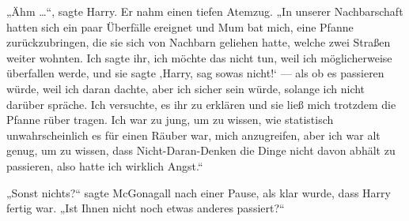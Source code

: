 „Ähm …“, sagte Harry. Er nahm einen tiefen Atemzug.
„In unserer Nachbarschaft hatten sich ein paar Überfälle ereignet und Mum bat mich, eine Pfanne zurückzubringen, die sie sich von Nachbarn geliehen hatte, welche zwei Straßen weiter wohnten. Ich sagte ihr, ich möchte das nicht tun, weil ich möglicherweise überfallen werde, und sie sagte ‚Harry, sag sowas nicht!‘ — als ob es passieren würde, weil ich daran dachte, aber ich sicher sein würde, solange ich nicht darüber spräche. Ich versuchte, es ihr zu erklären und sie ließ mich trotzdem die Pfanne rüber tragen. Ich war zu jung, um zu wissen, wie statistisch unwahrscheinlich es für einen Räuber war, mich anzugreifen, aber ich war alt genug, um zu wissen, dass Nicht-Daran-Denken die Dinge nicht davon abhält zu passieren, also hatte ich wirklich Angst.“

„Sonst nichts?“ sagte McGonagall nach einer Pause, als klar wurde, dass Harry fertig war.
„Ist Ihnen nicht noch etwas anderes passiert?“

